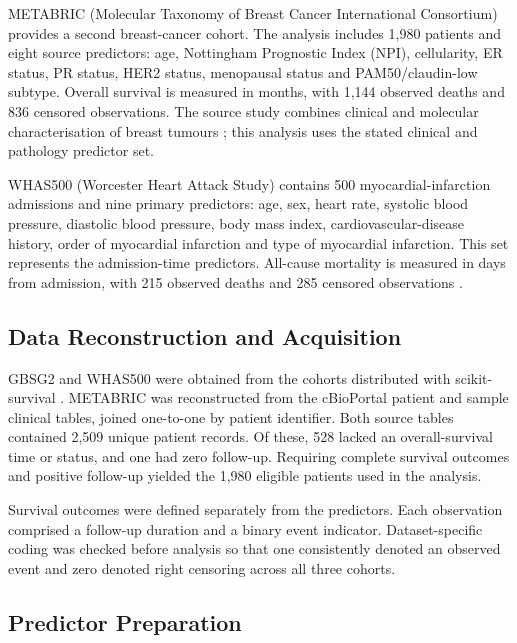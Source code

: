 METABRIC (Molecular Taxonomy of Breast Cancer International Consortium) provides a second breast-cancer cohort. The analysis includes 1,980 patients and eight source predictors: age, Nottingham Prognostic Index (NPI), cellularity, ER status, PR status, HER2 status, menopausal status and PAM50/claudin-low subtype. Overall survival is measured in months, with 1,144 observed deaths and 836 censored observations. The source study combines clinical and molecular characterisation of breast tumours \cite{curtis2012,pereira2016}; this analysis uses the stated clinical and pathology predictor set.

WHAS500 (Worcester Heart Attack Study) contains 500 myocardial-infarction admissions and nine primary predictors: age, sex, heart rate, systolic blood pressure, diastolic blood pressure, body mass index, cardiovascular-disease history, order of myocardial infarction and type of myocardial infarction. This set represents the admission-time predictors. All-cause mortality is measured in days from admission, with 215 observed deaths and 285 censored observations \cite{hosmer2008,polsterl2020}.

\subsection{Data Reconstruction and Acquisition}\label{data-reconstruction-and-acquisition.}

GBSG2 and WHAS500 were obtained from the cohorts distributed with scikit-survival \cite{polsterl2020}. METABRIC was reconstructed from the cBioPortal patient and sample clinical tables, joined one-to-one by patient identifier. Both source tables contained 2,509 unique patient records. Of these, 528 lacked an overall-survival time or status, and one had zero follow-up. Requiring complete survival outcomes and positive follow-up yielded the 1,980 eligible patients used in the analysis.

Survival outcomes were defined separately from the predictors. Each observation comprised a follow-up duration and a binary event indicator. Dataset-specific coding was checked before analysis so that one consistently denoted an observed event and zero denoted right censoring across all three cohorts.

\subsection{Predictor Preparation}\label{predictor-preparation}

